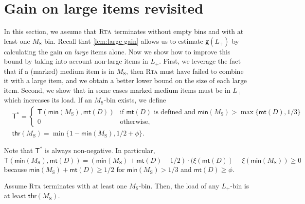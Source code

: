 \documentclass[a4paper,USenglish,cleveref]{lipics-v2019}
\newcommand{\M}{\ensuremath{M_\mathrm{S}}\xspace}
\newcommand{\LT}{\ensuremath{L_+}\xspace}
\newcommand{\D}{\ensuremath{D}\xspace}
\newcommand{\smallBoundary}{\ensuremath{\phi}}
\newcommand{\g}{\ensuremath{\xi}}
\newcommand{\gain}{\textsf{g}}
\newcommand{\thresh}{\textsf{thr}(\M)}
\newcommand{\mn}{\textsf{min}}
\newcommand{\mt}{\textsf{mt}(\D)}
\newcommand{\T}{\textsf{T}}
\newcommand{\Tmax}{\T^*}
\newcommand{\ALG}{\textsc{Rta}\xspace}
\begin{document}


\section{Gain on large items revisited}
\label{sec:large2}

In this section, we assume that $\ALG$ terminates without empty bins and with at least one $\M$-bin.
Recall that \cref{lem:large-gain} allows us to estimate $\gain(\LT)$ by calculating the 
gain on \emph{large} items alone. Now we show how to improve this bound by
taking into account non-large items in $\LT$. First, we leverage the fact that if a
(marked) medium item is in $\M$, then \ALG must have failed to combine it with a large
item, and we obtain a better lower bound on the size of each large item. 
Second, we show that in some cases marked medium items must be in $\LT$ which increases its load.
If an \M-bin exists, we define
\begin{align*}
  &\Tmax 
  = \begin{cases}
    \T(\mn(\M), \mt) & \text{if $\mt$ is defined and 
        $\mn(\M) > \max\{ \mt, 1/3 \}$} \\
    0 & \text{otherwise}, 
  \end{cases} \\
  & \thresh = \min \{ 1-\mn(\M), 1/2+\smallBoundary \}.
\end{align*}

Note that $\Tmax$ is always non-negative. In particular, 
$\T(\mn(\M), \mt) = (\mn(\M) + \mt - 1/2) \cdot (\g(\mt) -
\g(\mn(\M)) \geq 0$ because $\mn(\M) + \mt \geq 1/2$ for $\mn(\M) > 1/3$ and $\mt \geq \smallBoundary$.


\begin{lemma}
\label{lem:lbin-mwd-full}
Assume \ALG terminates with at least one \M-bin.
Then, the load of any \LT-bin is at least $\thresh$.
\end{lemma}
\end{document}
